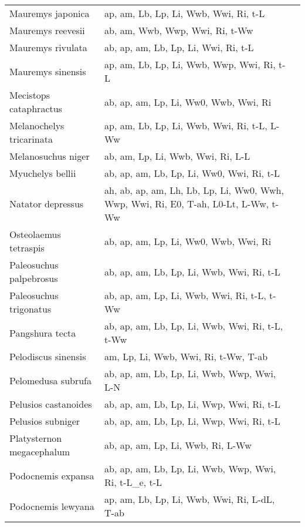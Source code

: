 \documentclass{article}
\begin{document}
{\begin{longtable}[c]{p{3.5cm}p{5.5cm}p{5.5cm}}
Mauremys japonica &  ap, am, Lb, Lp, Li, Wwb, Wwi, Ri, t-L & \citet{Yabe1989} \\
Mauremys reevesii &  ab, am, Wwb, Wwp, Wwi, Ri, t-Ww & \citet{DuShen2009} \\
Mauremys rivulata &  ab, ap, am, Lb, Lp, Li, Wwi, Ri, t-L & \citet{CiceKuma2016} \\
Mauremys sinensis &  ap, am, Lb, Lp, Li, Wwb, Wwp, Wwi, Ri, t-L & \citet{ChenLue1998} \\
Mecistops cataphractus &  ab, ap, am, Lp, Li, Ww0, Wwb, Wwi, Ri &  \\
Melanochelys tricarinata &  ap, am, Lb, Lp, Li, Wwb, Wwi, Ri, t-L, L-Ww & \citet{KumaHari2010} \\
Melanosuchus niger &  ab, am, Lp, Li, Wwb, Wwi, Ri, L-L & \citet{Herr1991} \\
Myuchelys bellii &  ab, ap, am, Lb, Lp, Li, Ww0, Wwi, Ri, t-L & \citet{FielLimp2015} \\
Natator depressus &  ah, ab, ap, am, Lh, Lb, Lp, Li, Ww0, Wwh, Wwp, Wwi, Ri, E0, T-ah, L0-Lt, L-Ww, t-Ww & \citet{Bent2017,Limp2007,WaayStub2016,DBCA2019,VenkKann2005,Wine2016,RuslBoot2016,StubMitc2019,Salm2017} \\
Osteolaemus tetraspis &  ab, ap, am, Lp, Li, Ww0, Wwb, Wwi, Ri &  \\
Paleosuchus palpebrosus &  ab, ap, am, Lb, Lp, Li, Wwb, Wwi, Ri, t-L & \citet{CampMahn2013} \\
Paleosuchus trigonatus &  ab, ap, am, Lp, Li, Wwb, Wwi, Ri, t-L, t-Ww &  \\
Pangshura tecta &  ab, ap, am, Lb, Lp, Li, Wwb, Wwi, Ri, t-L, t-Ww & \citet{Vyas1979} \\
Pelodiscus sinensis &  am, Lp, Li, Wwb, Wwi, Ri, t-Ww, T-ab & \citet{JiChen2003} \\
Pelomedusa subrufa &  ab, ap, am, Lb, Lp, Li, Wwb, Wwp, Wwi, L-N & \citet{Stry2001} \\
Pelusios castanoides &  ab, ap, am, Lb, Lp, Li, Wwp, Wwi, Ri, t-L & \citet{Gerl2008} \\
Pelusios subniger &  ab, ap, am, Lb, Lp, Li, Wwp, Wwi, Ri, t-L & \citet{Gerl2008} \\
Platysternon megacephalum &  ab, ap, am, Lp, Li, Wwb, Ri, L-Ww & \citet{SungHau2014,SungHau2015} \\
Podocnemis expansa &  ab, ap, am, Lb, Lp, Li, Wwb, Wwp, Wwi, Ri, t-L\_e, t-L & \citet{MagaVogt2017,ChinVale2008} \\
Podocnemis lewyana &  ap, am, Lb, Lp, Li, Wwb, Wwi, Ri, L-dL, T-ab & \citet{PaezBock2015,PaezCorr2009} \\

\end{longtable}}
\end{document}
